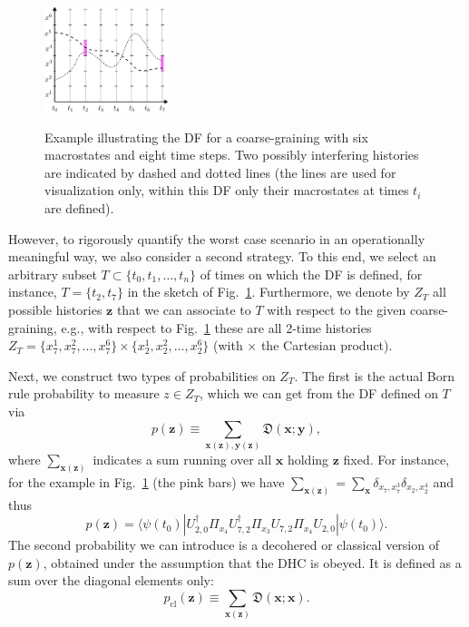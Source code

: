 \documentclass[pre,twocolumn,10pt,aps,longbibliography,nofootinbib]{revtex4-1}
\newcommand{\bb}[1]{\textbf{#1}}
\newcommand{\mf}[1]{{\mathfrak{#1}}}
\newcommand{\lr}[1]{{\langle {#1}\rangle}}
\begin{document}
\begin{figure}[t]
 \centering\includegraphics[width=0.32\textwidth,clip=true]{paths_v2.pdf}
 \label{fig paths}
 \caption{Example illustrating the DF for a coarse-graining with six macrostates and eight time steps. Two possibly interfering histories are indicated by dashed and dotted lines (the lines are used for visualization only, within this DF only their macrostates at times $t_i$ are defined). }
\end{figure}

However, to rigorously quantify the worst case scenario in an operationally meaningful way, we also consider a second strategy. To this end, we select an arbitrary subset $T\subset\{t_0,t_1,\dots,t_n\}$ of times on which the DF is defined, for instance, $T = \{t_2,t_7\}$ in the sketch of Fig.~\ref{fig paths}. Furthermore, we denote by $Z_T$ all possible histories $\bb z$ that we can associate to $T$ with respect to the given coarse-graining, e.g., with respect to Fig.~\ref{fig paths} these are all 2-time histories $Z_T = \{x^1_7,x^2_7,\dots,x^6_7\} \times \{x^1_2,x^2_2,\dots,x^6_2\}$ (with $\times$ the Cartesian product).

Next, we construct two types of probabilities on $Z_T$. The first is the actual Born rule probability to measure $z\in Z_T$, which we can get from the DF defined on $T$ via
\begin{equation}\label{eq prob quantum}
 p(\bb z) \equiv \sum_{\bb x(\bb z),\bb y(\bb z)} \mf{D}(\bb x;\bb y),
\end{equation}
where $\sum_{\bb x(\bb z)}$ indicates a sum running over all $\bb x$ holding $\bb z$ fixed. For instance, for the example in Fig.~\ref{fig paths} (the pink bars) we have $\sum_{\bb x(\bb z)} = \sum_{\bb x} \delta_{x_7,x^3_7} \delta_{x_2,x_2^4}$ and thus
\begin{equation}
 p(\bb z) = \lr{\psi(t_0)|U^\dagger_{2,0}\Pi_{x_4}U^\dagger_{7,2}\Pi_{x_3}U_{7,2}\Pi_{x_4}U_{2,0}|\psi(t_0)}.
\end{equation}
The second probability we can introduce is a decohered or classical version of $p(\bb z)$, obtained under the assumption that the DHC is obeyed. It is defined as a sum over the diagonal elements only:
\begin{equation}\label{eq prob classical}
 p_\text{cl}(\bb z) \equiv \sum_{\bb x(\bb z)} \mf{D}(\bb x;\bb x).
\end{equation}
\end{document}
